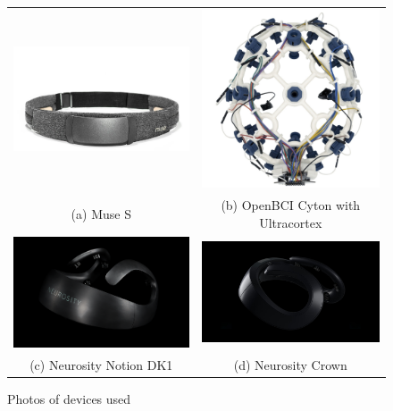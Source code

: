             \begin{center}
            \begin{figure}
                \begin{widepage}
                \begin{tabular}{cc}
                    \includegraphics[width=65mm]{img/Muse-S.jpg}
                    & \includegraphics[width=65mm]{img/openbci-cyton.jpg}
                    \\
                    (a) Muse S
                    & (b) OpenBCI Cyton with Ultracortex
                    \\[6pt]
                    \includegraphics[width=65mm]{img/neurosity-notion.png}
                    & \includegraphics[width=65mm]{img/neurosity-crown.jpg}
                    \\
                    (c) Neurosity Notion DK1
                    & (d) Neurosity Crown
                    \\[6pt]
                \end{tabular}
                \caption{Photos of devices used}
                \end{widepage}
            \end{figure}
            \end{center}

